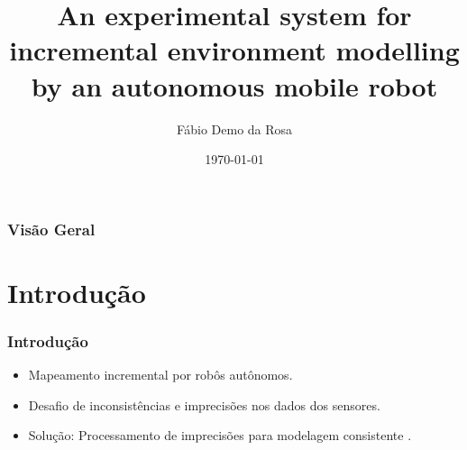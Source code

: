 \documentclass[xcolor=dvipsnames, aspectratio=169]{beamer}
\title[An experimental system for incremental environment modelling by an autonomous mobile robot]{An experimental system for incremental environment modelling by an autonomous mobile robot} %
\author[FDR]{Fábio Demo da Rosa} %
\institute[UFSM] %
{
Universidade Federal de Santa Maria \\ %
Pós-Graduação em Ciência da Computação \\
Disciplina de Robótica Móvel\\
\medskip
\textit{faberdemo@gmail.com} %
}
\date{\today} %
\begin{document}
\begin{frame}
\titlepage %
\end{frame}

\begin{frame}
\frametitle{Visão Geral} %
\tableofcontents %
\end{frame}


\section{Introdução}
\begin{frame}[fragile]
  \frametitle{Introdução}
  \begin{itemize}
    \item Mapeamento incremental por robôs autônomos.
    \item Desafio de inconsistências e imprecisões nos dados dos sensores.
    \item Solução: Processamento de imprecisões para modelagem consistente \cite{moutarlier2006experimental}.
  \end{itemize}
\end{frame}

\end{document}

